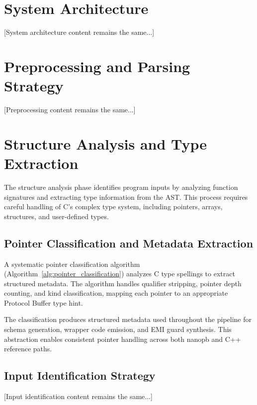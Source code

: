 \documentclass[doublespace,nopageskip]{VTthesis}
\begin{document}
    \section{System Architecture} \label{se:system_architecture}

    [System architecture content remains the same...]

  \section{Preprocessing and Parsing Strategy} \label{se:preprocessing_parsing}

  [Preprocessing content remains the same...]

  \section{Structure Analysis and Type Extraction} \label{se:structure_analysis}

  The structure analysis phase identifies program inputs by analyzing function signatures and extracting type information from the AST. This process requires careful handling of C's complex type system, including pointers, arrays, structures, and user-defined types.

  \subsection{Pointer Classification and Metadata Extraction}

  A systematic pointer classification algorithm (Algorithm~\ref{alg:pointer_classification}) analyzes C type spellings to extract structured metadata. The algorithm handles qualifier stripping, pointer depth counting, and kind classification, mapping each pointer to an appropriate Protocol Buffer type hint.

  

  The classification produces structured metadata used throughout the pipeline for schema generation, wrapper code emission, and EMI guard synthesis. This abstraction enables consistent pointer handling across both nanopb and C++ reference paths.

  \subsection{Input Identification Strategy}

  [Input identification content remains the same...]
\end{document}
